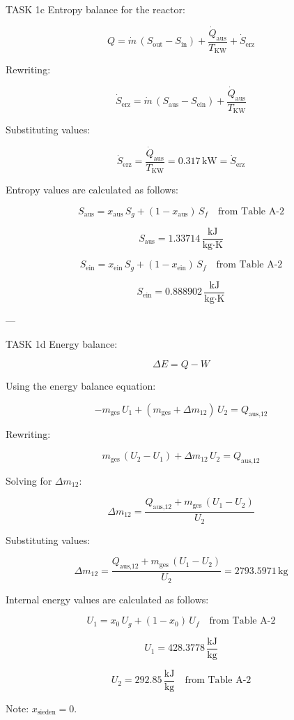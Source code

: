 TASK 1c  
Entropy balance for the reactor:  

\[
Q = \dot{m} \, (S_{\text{out}} - S_{\text{in}}) + \frac{\dot{Q}_{\text{aus}}}{T_{\text{KW}}} + \dot{S}_{\text{erz}}
\]

Rewriting:  

\[
\dot{S}_{\text{erz}} = \dot{m} \, (S_{\text{aus}} - S_{\text{ein}}) + \frac{\dot{Q}_{\text{aus}}}{T_{\text{KW}}}
\]

Substituting values:  

\[
\dot{S}_{\text{erz}} = \frac{\dot{Q}_{\text{aus}}}{T_{\text{KW}}} = 0.317 \, \text{kW} = \dot{S}_{\text{erz}}
\]

Entropy values are calculated as follows:  

\[
S_{\text{aus}} = x_{\text{aus}} \, S_g + (1 - x_{\text{aus}}) \, S_f \quad \text{from Table A-2}
\]

\[
S_{\text{aus}} = 1.33714 \, \frac{\text{kJ}}{\text{kg·K}}
\]

\[
S_{\text{ein}} = x_{\text{ein}} \, S_g + (1 - x_{\text{ein}}) \, S_f \quad \text{from Table A-2}
\]

\[
S_{\text{ein}} = 0.888902 \, \frac{\text{kJ}}{\text{kg·K}}
\]

---

TASK 1d  
Energy balance:  

\[
\Delta E = Q - W
\]

Using the energy balance equation:  

\[
-m_{\text{ges}} \, U_1 + (m_{\text{ges}} + \Delta m_{12}) \, U_2 = Q_{\text{aus,12}}
\]

Rewriting:  

\[
m_{\text{ges}} \, (U_2 - U_1) + \Delta m_{12} \, U_2 = Q_{\text{aus,12}}
\]

Solving for \( \Delta m_{12} \):  

\[
\Delta m_{12} = \frac{Q_{\text{aus,12}} + m_{\text{ges}} \, (U_1 - U_2)}{U_2}
\]

Substituting values:  

\[
\Delta m_{12} = \frac{Q_{\text{aus,12}} + m_{\text{ges}} \, (U_1 - U_2)}{U_2} = 2793.5971 \, \text{kg}
\]

Internal energy values are calculated as follows:  

\[
U_1 = x_0 \, U_g + (1 - x_0) \, U_f \quad \text{from Table A-2}
\]

\[
U_1 = 428.3778 \, \frac{\text{kJ}}{\text{kg}}
\]

\[
U_2 = 292.85 \, \frac{\text{kJ}}{\text{kg}} \quad \text{from Table A-2}
\]

Note: \( x_{\text{sieden}} = 0 \).